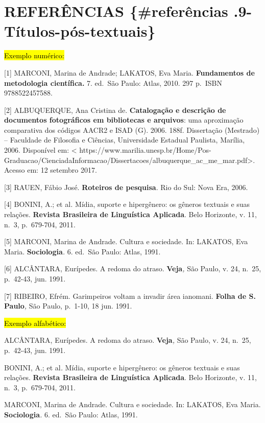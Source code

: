 \documentclass[
]{article}
\begin{document}
\section{REFERÊNCIAS \{\#referências
.9-Títulos-pós-textuais\}}\label{referuxeancias-referuxeancias-.9-tuxedtulos-puxf3s-textuais}

\hl{Exemplo numérico:}

{[}1{]} MARCONI, Marina de Andrade; LAKATOS, Eva Maria.
\textbf{Fundamentos de metodologia científica. }7. ed.~São Paulo: Atlas,
2010. 297 p.~ISBN 9788522457588.

{[}2{]} ALBUQUERQUE, Ana Cristina de. \textbf{Catalogação e descrição de
documentos fotográficos em bibliotecas e arquivos}: uma aproximação
comparativa dos códigos AACR2 e ISAD (G). 2006. 188f. Dissertação
(Mestrado) -- Faculdade de Filosofia e Ciências, Universidade Estadual
Paulista, Marília, 2006. Disponível em: \textless{}
https://www.marilia.unesp.br/Home/Pos-Graduacao/CienciadaInformacao/Dissertacoes/albuquerque\_ac\_me\_mar.pdf\textgreater.
Acesso em: 12 setembro 2017.

{[}3{]} RAUEN, Fábio José. \textbf{Roteiros de pesquisa}. Rio do Sul:
Nova Era, 2006.

{[}4{]} BONINI, A.; et al\emph{.} Mídia, suporte e hipergênero: os
gêneros textuais e suas relações. \textbf{Revista Brasileira de
Linguística Aplicada}. Belo Horizonte, v. 11, n.~3, p.~679-704, 2011.

{[}5{]} MARCONI, Marina de Andrade. Cultura e sociedade. In: LAKATOS,
Eva Maria. \textbf{Sociologia}\emph{.} 6. ed.~São Paulo: Atlas, 1991.

{[}6{]} ALCÂNTARA, Eurípedes. A redoma do atraso. \textbf{Veja}\emph{,}
São Paulo, v. 24, n.~25, p.~42-43, jun. 1991.

{[}7{]} RIBEIRO, Efrém. Garimpeiros voltam a invadir área ianomani.
\textbf{Folha de S. Paulo}\emph{,} São Paulo, p.~1-10, 18 jun. 1991.

\hl{Exemplo alfabético:}

ALCÂNTARA, Eurípedes. A redoma do atraso. \textbf{Veja}\emph{,} São
Paulo, v. 24, n.~25, p.~42-43, jun. 1991.

BONINI, A.; et al\emph{.} Mídia, suporte e hipergênero: os gêneros
textuais e suas relações. \textbf{Revista Brasileira de Linguística
Aplicada}. Belo Horizonte, v. 11, n.~3, p.~679-704, 2011.

MARCONI, Marina de Andrade. Cultura e sociedade. In: LAKATOS, Eva Maria.
\textbf{Sociologia}\emph{.} 6. ed.~São Paulo: Atlas, 1991.
\end{document}
